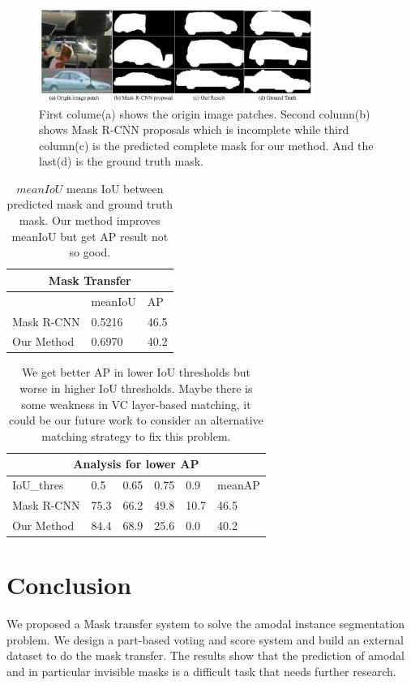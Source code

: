 \documentclass[10pt,twocolumn,letterpaper]{article}
\begin{document}
\begin{figure}[tpb]
	\begin{center}
		\includegraphics[width=0.8\textwidth]{result.png}
		
		\caption{First colume(a) shows the origin image patches. Second column(b) shows Mask R-CNN proposals which is incomplete while third column(c) is the predicted complete mask for our method. And the last(d) is the ground truth mask.}
		\label{fig:result}
	\end{center}
	
\end{figure}
\begin{table}
	\begin{center}
		\begin{tabular}{lll}
			\multicolumn{3}{c}{Mask Transfer} \\
			\hline
			  &  meanIoU & AP   \\
			\hline
			Mask R-CNN & 0.5216 &  46.5 \\
			Our Method & 0.6970 & 40.2 
		\end{tabular}
	\end{center}
	\caption{$meanIoU$ means IoU between predicted mask and  ground truth mask. Our method improves meanIoU but get AP result not so good.}
\label{tab: AP}
\end{table}


\begin{table}
\begin{center}
	\begin{tabular}{llllll}
		\multicolumn{6}{c}{Analysis for lower AP} \\
		\hline
		IoU\_thres&  0.5 & 0.65 & 0.75 & 0.9 & meanAP \\
		\hline
		Mask R-CNN & 75.3 & 66.2 & 49.8 & 10.7 & 46.5 \\
		Our Method & 84.4 &68.9  & 25.6 & 0.0 & 40.2 
	\end{tabular}
\end{center}
\caption{We get better AP in lower IoU thresholds but worse in higher IoU thresholds. Maybe there is some weakness in VC layer-based matching, it could be our future work to consider an alternative matching strategy to fix this problem.
}
\label{tab:analysis}
\end{table}


\section{Conclusion}
We proposed a Mask transfer system to solve the amodal instance segmentation problem.
 We design a part-based voting and score system and build an external dataset to do the mask transfer.
The results show that the prediction of amodal and in particular invisible masks is a difficult task that needs further research.


{\small


}
\end{document}
